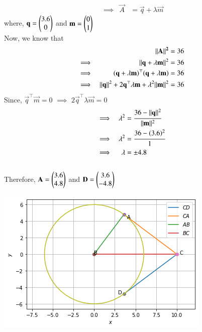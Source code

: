 \documentclass[journal,12pt,twocolumn]{IEEEtran}
\begin{document}
\begin{enumerate}
\begin{align}
&\implies& \vec{A} &= \vec{q} + \lambda \vec{m}
\end{align}
where, $\mathbf{q} = \begin{pmatrix}3.6 \\ 0\end{pmatrix}$ and $\mathbf{m} = \begin{pmatrix}0 \\ 1\end{pmatrix}$\\
Now, we know that
\begin{align}
&&\mathbf{\lVert A\rVert^2} &= 36\\
&\implies& \lVert\mathbf{q}+\lambda \mathbf{m}\rVert^2 &= 36\\
&\implies& (\mathbf{q}+\lambda \mathbf{m})^\top(\mathbf{q}+\lambda \mathbf{m})&= 36\\
&\implies& \lVert\mathbf{q}\rVert^2 + 2\mathbf{q}^\top \lambda \mathbf{m} + \lambda^2 \lVert\mathbf{m}\rVert^2 &= 36
\end{align}
Since, $\vec{q}^\top \vec{m} = 0$ $\implies$
$2\vec{q}^\top \lambda \vec{m} = 0$
\begin{align}
&\implies&\lambda^2 &= \cfrac{36-\lVert\mathbf{q}\rVert^2}{\lVert\mathbf{m}\rVert^2}\\
&\implies& \lambda^2 &= \cfrac{36-(3.6)^2}{1}\\
&\implies& \lambda &= \pm 4.8
\end{align}\\
Therefore, $\mathbf{A} = \begin{pmatrix}3.6 \\ 4.8\end{pmatrix}$ and $\mathbf{D} = \begin{pmatrix}3.6 \\ -4.8\end{pmatrix}$ 
\begin{center}
    \includegraphics{assignment3.png}
\end{center}
\end{enumerate}
\end{document}

